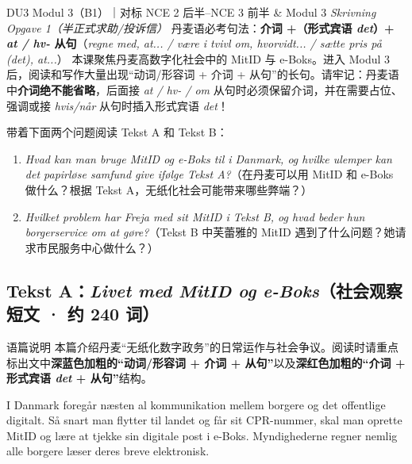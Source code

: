 {DU3 Modul 3（B1）｜对标 NCE 2 后半--NCE 3 前半 \& Modul 3 \textit{Skrivning Opgave 1（半正式求助/投诉信）}}
{丹麦语必考句法：\textbf{介词 +（形式宾语 \textit{det}）+ \textit{at / hv-} 从句}（\textit{regne med, at... / være i tvivl om, hvorvidt... / sætte pris på (det), at...}）}
{本课聚焦丹麦高数字化社会中的 MitID 与 e-Boks。进入 Modul 3 后，阅读和写作大量出现“动词/形容词 + 介词 + 从句”的长句。请牢记：丹麦语中\textbf{介词绝不能省略}，后面接 \textit{at / hv- / om} 从句时必须保留介词，并在需要占位、强调或接 \textit{hvis/når} 从句时插入形式宾语 \textit{det}！}

\begin{foerduleaeser}
带着下面两个问题阅读 Tekst A 和 Tekst B：
\begin{enumerate}
  \item \textit{Hvad kan man bruge MitID og e-Boks til i Danmark, og hvilke ulemper kan det papirløse samfund give ifølge Tekst A?}（在丹麦可以用 MitID 和 e-Boks 做什么？根据 Tekst A，无纸化社会可能带来哪些弊端？）
  \item \textit{Hvilket problem har Freja med sit MitID i Tekst B, og hvad beder hun borgerservice om at gøre?}（Tekst B 中芙蕾雅的 MitID 遇到了什么问题？她请求市民服务中心做什么？）
\end{enumerate}
\end{foerduleaeser}


\subsection*{Tekst A：\textit{Livet med MitID og e-Boks}（社会观察短文 · 约 240 词）}

\begin{tipbox}{语篇说明}
本篇介绍丹麦“无纸化数字政务”的日常运作与社会争议。阅读时请重点标出文中\textbf{\color{NCDNavy}深蓝色加粗的“动词/形容词 + 介词 + 从句”}以及\textbf{\color{NCDRed}深红色加粗的“介词 + 形式宾语 \textit{det} + 从句”}结构。
\end{tipbox}

I Danmark foregår næsten al kommunikation mellem borgere og det offentlige digitalt. Så snart man flytter til landet og får sit CPR-nummer, skal man oprette MitID og lære at tjekke sin digitale post i e-Boks. Myndighederne regner nemlig  alle borgere læser deres breve elektronisk.

